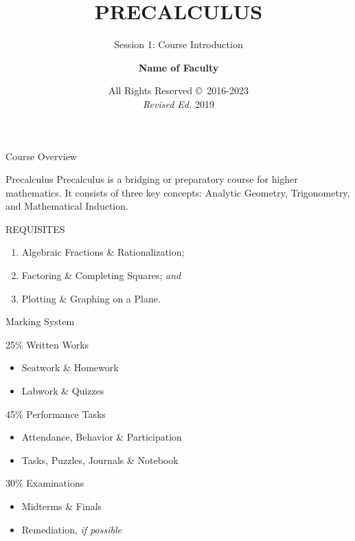 \documentclass[12pt]{beamer}
\begin{document}
\title{\textbf{PRECALCULUS}}
\subtitle{Session 1: Course Introduction}
\author{\textbf{Name of Faculty}}
\date{All Rights Reserved \copyright \, 2016-2023 \\ \textit{Revised Ed.} 2019}

\begin{frame}
  \maketitle
\end{frame}

\begin{frame}{Course Overview}
  \begin{block}{Precalculus}
  \justifying
    Precalculus is a bridging or preparatory course for higher mathematics. It consists of three key concepts: Analytic Geometry, Trigonometry, and Mathematical Induction.
  \end{block}
  REQUISITES
  \begin{enumerate}
   \item Algebraic Fractions \& Rationalization;
   \item Factoring \& Completing Squares; \textit{and}
   \item Plotting \& Graphing on a Plane.
  \end{enumerate}
\end{frame}

\begin{frame}{Marking System}
  \begin{block}{25\% Written Works}
   \begin{itemize}
    \item Seatwork \& Homework
    \item Labwork \& Quizzes
   \end{itemize}
  \end{block}

  \begin{block}{45\% Performance Tasks}
  \begin{itemize}
   \item Attendance, Behavior \& Participation
   \item Tasks, Puzzles, Journals \& Notebook
  \end{itemize}
  \end{block}

  \begin{block}{30\% Examinations}
   \begin{itemize}
    \item Midterms \& Finals
    \item Remediation, \textit{if possible}
   \end{itemize}
  \end{block}
\end{frame}
\end{document}
